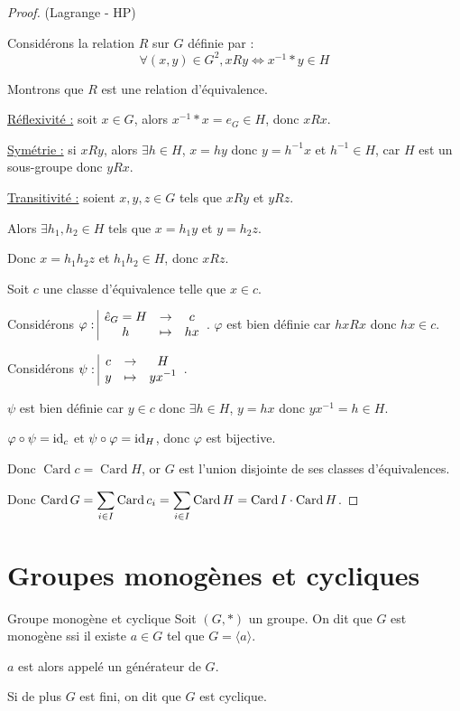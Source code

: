 \avspace {}

\begin{proof}(Lagrange - HP)

    Considérons la relation $R$ sur $G$ définie par :
    \[\forall (x, y) \in G^2, x R y \Leftrightarrow x^{-1} \ast y \in H\]

    Montrons que $R$ est une relation d'équivalence.

    \uline{Réflexivité :}
    soit $x \in G$, alors $x^{-1} \ast x = e_G \in H$, donc $x R x$.
    
    \uline{Symétrie :}
    si $x R y$, alors $\exists h \in H$, $x = hy$ donc $y = h^{-1} x$ 
    et $h^{-1} \in H$, car $H$ est un sous-groupe donc $y R x$.

    \uline{Transitivité :}
    soient $x, y, z \in G$ tels que $x R y$ et $y R z$.

    Alors $\exists h_1, h_2 \in H$ tels que $x = h_1 y$ et $y = h_2 z$.

    Donc $x = h_1 h_2 z$ et $h_1 h_2 \in H$, donc $x R z$.
    
    \lvspace Soit $c$ une classe d'équivalence telle que $x \in c$. 

    Considérons $\varphi: \space \begin{array}{|ccc} \displaystyle \hat e_G = H & \to & \displaystyle c \\ \displaystyle h & \mapsto & \displaystyle h x \end{array}$. 
    $\varphi$ est bien définie car $hx R x$ donc $hx \in c$. 

    Considérons $\psi: \space \begin{array}{|ccc} \displaystyle c & \to & \displaystyle H \\ \displaystyle y & \mapsto & \displaystyle yx^{-1} \end{array}$.

    $\psi$ est bien définie car $y \in c$ donc $\exists h \in H$, $y = hx$ donc $yx^{-1} = h \in H$.

    $\varphi \circ \psi = \operatorname{id}_c$ et $\psi \circ \varphi = \operatorname{id}_H$, donc $\varphi$ est bijective. 

    Donc $\operatorname{Card} c = \operatorname{Card} H$, or $G$ est l'union disjointe de ses classes d'équivalences.

    Donc $\displaystyle \operatorname{Card} G = \sum_{i \in I} \operatorname{Card} c_i = \sum_{i \in I} \operatorname{Card} H = \operatorname{Card} I \cdot \operatorname{Card} H$.
\end{proof}

\section{Groupes monogènes et cycliques}

\begin{definition}{Groupe monogène et cyclique}{}
    Soit $(G, \ast)$ un groupe. On dit que $G$ est monogène ssi il existe $a \in G$ tel que 
    $G = \langle a \rangle$. 

    $a$ est alors appelé un générateur de $G$.

    Si de plus $G$ est fini, on dit que $G$ est cyclique.
\end{definition}


